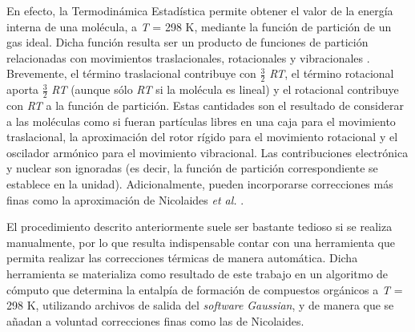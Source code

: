 En efecto, la Termodinámica Estadística permite obtener el valor de la energía interna
de una molécula, a \textit{T} = 298 K, mediante la función de partición de un gas ideal. Dicha
función resulta ser un producto de funciones de partición relacionadas con movimientos
traslacionales, rotacionales y vibracionales  \cite{McQuarrie1976, Nicolaides1996}.
Brevemente, el término traslacional contribuye con $\frac{3}{2}$ \textit{RT}, el término
rotacional aporta $\frac{3}{2}$ \textit{RT} (aunque sólo \textit{RT} si la molécula es lineal) y el rotacional contribuye con \textit{RT} a la función de partición. Estas cantidades son el resultado de considerar a las moléculas como si
fueran partículas libres en una caja para el movimiento traslacional, la aproximación del rotor
rígido para el movimiento rotacional y el oscilador armónico para el movimiento vibracional\cite{Nicolaides1996}. Las contribuciones electrónica y nuclear son ignoradas (es decir, la función de partición correspondiente se establece en la unidad).
Adicionalmente, pueden incorporarse correcciones más finas como la aproximación de Nicolaides \textit{et al.} \cite{McQuarrie1976}.

El procedimiento descrito anteriormente suele ser bastante tedioso si se realiza manualmente,
por lo que resulta indispensable contar con una herramienta que permita realizar
las correcciones térmicas de manera automática. Dicha herramienta se materializa como resultado de este trabajo en un algoritmo de cómputo que determina la entalpía de formación de compuestos orgánicos
a \textit{T} = 298 K, utilizando archivos de salida del \textit{software} \textit{Gaussian}, y de manera que
se añadan a voluntad correcciones finas como las de Nicolaides.









